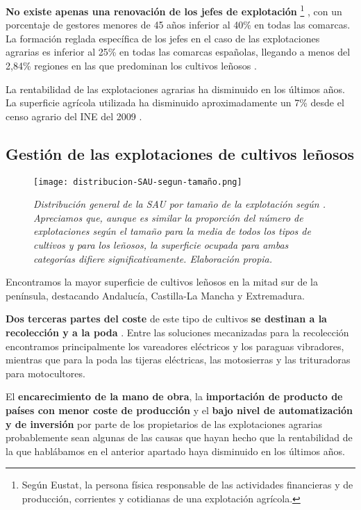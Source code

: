 \textbf{No existe apenas una renovación de los jefes de explotación}%
\footnote{%
    Según Eustat, la persona física responsable de las actividades financieras y de producción, corrientes y cotidianas de una explotación agrícola.
}%
, con un porcentaje de gestores menores de 45 años
inferior al 40\% en todas las comarcas. La formación reglada específica de los jefes en el caso de
las explotaciones agrarias es inferior al 25\% en todas las comarcas españolas,
llegando a menos del 2,84\% regiones en las que predominan los cultivos leñosos
 \cite[Formación de los jefes de explotación]{INEpanoramicaCensoAgrario}.

La rentabilidad de las explotaciones agrarias ha disminuido en los últimos años. La superficie agrícola
utilizada ha disminuido aproximadamente un 7\% desde el censo agrario del INE del 2009
 \cite[Tamaño y número de las explotaciones agrícolas]{INEpanoramicaCensoAgrario}.

\subsection{Gestión de las explotaciones de cultivos leñosos}

\begin{figure}[!b]
    \centering
    \texttt{[image: distribucion-SAU-segun-tamaño.png]}
    \caption{\textit{Distribución general de la SAU por tamaño de la explotación según
    \cite{INEdistribucionDeLaSuperficiePorTamaño}. Apreciamos que, aunque es similar la
    proporción del número de explotaciones según el tamaño para la media de todos los tipos
    de cultivos y para los leñosos, la superficie ocupada para ambas categorías difiere
    significativamente. Elaboración propia.}}
\end{figure}

Encontramos la mayor superficie de cultivos leñosos en la mitad sur de la península,
destacando Andalucía, Castilla-La Mancha y Extremadura.
\cite[Reparto de la superficie dedicada a los grandes cultivos.]{INEpanoramicaCensoAgrario}

\textbf{Dos terceras partes del coste} de este tipo de cultivos \textbf{se destinan a la
recolección y a la poda}
 \cite{Mecaolivar}.
Entre las soluciones mecanizadas para la recolección encontramos principalmente
los vareadores eléctricos y los paraguas vibradores,
mientras que para la poda las tijeras eléctricas, las motosierras y
las trituradoras para motocultores.

El \textbf{encarecimiento de la mano de obra}, la \textbf{importación de producto de países con menor coste de
producción} y el \textbf{bajo nivel de automatización y de inversión} por parte
de los propietarios de las explotaciones agrarias probablemente sean 
algunas de las causas que hayan hecho que la rentabilidad de la que
hablábamos en el anterior apartado haya disminuido en los últimos años.

